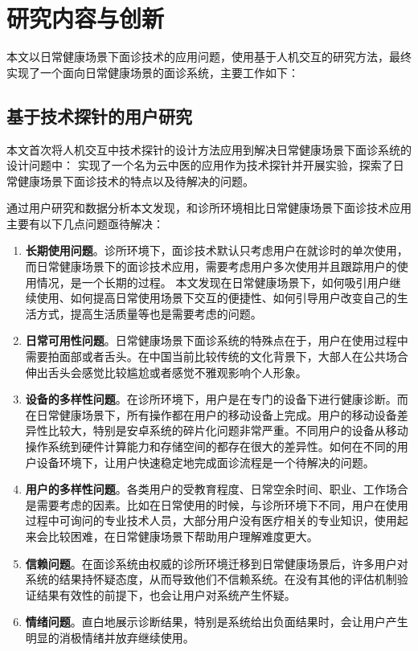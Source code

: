 \section{研究内容与创新}

本文以日常健康场景下面诊技术的应用问题，使用基于人机交互的研究方法，最终实现了一个面向日常健康场景的面诊系统，主要工作如下：

\subsection{基于技术探针的用户研究}

本文首次将人机交互中技术探针的设计方法应用到解决日常健康场景下面诊系统的设计问题中：
实现了一个名为云中医的应用作为技术探针并开展实验，探索了日常健康场景下面诊技术的特点以及待解决的问题。

通过用户研究和数据分析本文发现，和诊所环境相比日常健康场景下面诊技术应用主要有以下几点问题亟待解决：
\begin{enumerate}
    \item \textbf{长期使用问题}。诊所环境下，面诊技术默认只考虑用户在就诊时的单次使用，而日常健康场景下的面诊技术应用，需要考虑用户多次使用并且跟踪用户的使用情况，是一个长期的过程。
    本文发现在日常健康场景下，如何吸引用户继续使用、如何提高日常使用场景下交互的便捷性、如何引导用户改变自己的生活方式，提高生活质量等也是需要考虑的问题。
    
    \item \textbf{日常可用性问题}。日常健康场景下面诊系统的特殊点在于，用户在使用过程中需要拍面部或者舌头。在中国当前比较传统的文化背景下，大部人在公共场合伸出舌头会感觉比较尴尬或者感觉不雅观影响个人形象。

    \item \textbf{设备的多样性问题}。在诊所环境下，用户是在专门的设备下进行健康诊断。而在日常健康场景下，所有操作都在用户的移动设备上完成。用户的移动设备差异性比较大，特别是安卓系统的碎片化问题非常严重。不同用户的设备从移动操作系统到硬件计算能力和存储空间的都存在很大的差异性。如何在不同的用户设备环境下，让用户快速稳定地完成面诊流程是一个待解决的问题。
    
    \item \textbf{用户的多样性问题}。各类用户的受教育程度、日常空余时间、职业、工作场合是需要考虑的因素。比如在日常使用的时候，与诊所环境下不同，用户在使用过程中可询问的专业技术人员，大部分用户没有医疗相关的专业知识，使用起来会比较困难，在日常健康场景下帮助用户理解难度更大。
        
    \item \textbf{信赖问题}。在面诊系统由权威的诊所环境迁移到日常健康场景后，许多用户对系统的结果持怀疑态度，从而导致他们不信赖系统。在没有其他的评估机制验证结果有效性的前提下，也会让用户对系统产生怀疑。
    
    \item \textbf{情绪问题}。直白地展示诊断结果，特别是系统给出负面结果时，会让用户产生明显的消极情绪并放弃继续使用。 
\end{enumerate}

